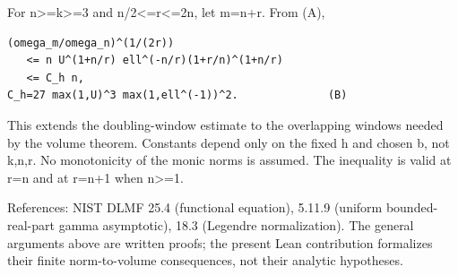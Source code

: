 For n\textgreater=k\textgreater=3 and n/2\textless=r\textless=2n, let m=n+r. From (A),

\begin{verbatim}
(omega_m/omega_n)^(1/(2r))
   <= n U^(1+n/r) ell^(-n/r)(1+r/n)^(1+n/r)
   <= C_h n,
C_h=27 max(1,U)^3 max(1,ell^(-1))^2.              (B)
\end{verbatim}

This extends the doubling-window estimate to the overlapping windows needed by the volume theorem. Constants depend only on the fixed h and chosen b, not k,n,r. No monotonicity of the monic norms is assumed. The inequality is valid at r=n and at r=n+1 when n\textgreater=1.

References: NIST DLMF 25.4 (functional equation), 5.11.9 (uniform bounded-real-part gamma asymptotic), 18.3 (Legendre normalization). The general arguments above are written proofs; the present Lean contribution formalizes their finite norm-to-volume consequences, not their analytic hypotheses.
